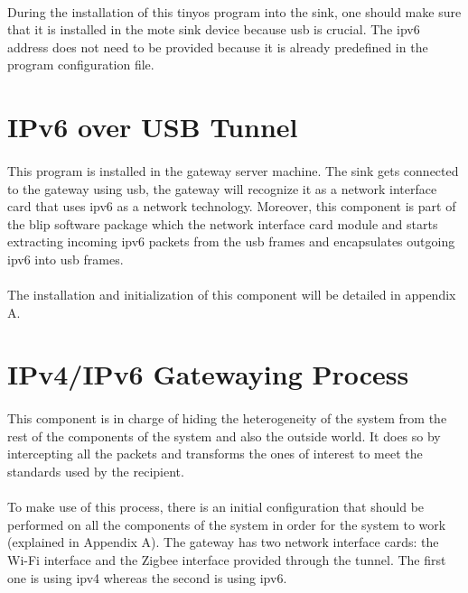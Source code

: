 \documentclass[oneside,12pt,a4paper,final]{book}
\begin{document}
\paragraph{}
During the installation of this \gls{tinyos} program into the sink, one should make sure that it is installed in the mote sink device because \gls{usb} is crucial. The \gls{ipv6} address does not need to be provided because it is already predefined in the program configuration file.

\section{IPv6 over USB Tunnel}
\paragraph{}
This program is installed in the gateway server machine. The sink gets connected to the gateway using \gls{usb}, the gateway will recognize it as a network interface card that uses \gls{ipv6} as a network technology. Moreover, this component is part of the \gls{blip} software package which the network interface card module and starts extracting incoming \gls{ipv6} packets from the \gls{usb} frames and encapsulates outgoing \gls{ipv6} into \gls{usb} frames.
\paragraph{}
The installation and initialization of this component will be detailed in appendix A.
\section{IPv4/IPv6 Gatewaying Process}
\paragraph{}
This component is in charge of hiding the heterogeneity of the system from the rest of the components of the system and also the outside world. It does so by intercepting all the packets and transforms the ones of interest to meet the standards used by the recipient.
\paragraph{}
To make use of this process, there is an initial configuration that should be performed on all the components of the system in order for the system to work (explained in Appendix A). The gateway has two network interface cards: the Wi-Fi interface and the Zigbee interface provided through the tunnel. The first one is using \gls{ipv4} whereas the second is using \gls{ipv6}.
\end{document}
